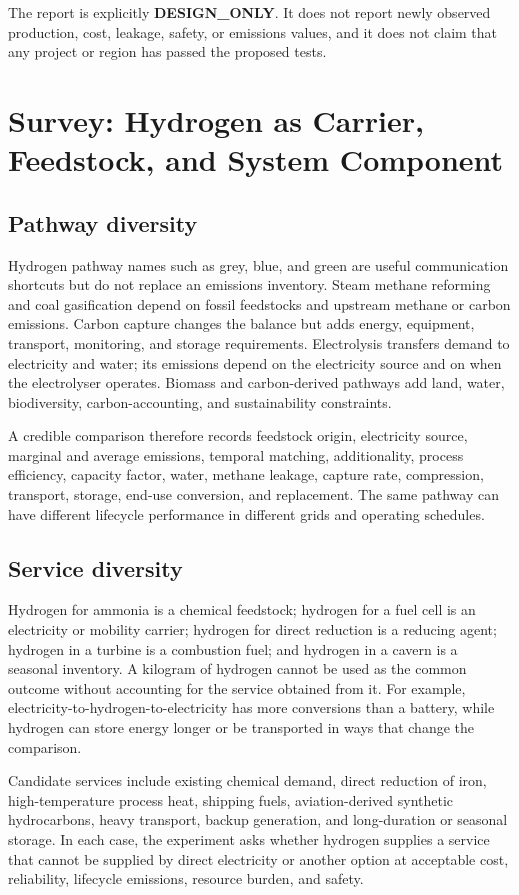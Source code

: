 \documentclass[conference]{IEEEtran}
\begin{document}
The report is explicitly \textbf{DESIGN\_ONLY}. It does not report newly observed production, cost, leakage, safety, or emissions values, and it does not claim that any project or region has passed the proposed tests.

\section{Survey: Hydrogen as Carrier, Feedstock, and System Component}
\label{sec:survey}
\subsection{Pathway diversity}
Hydrogen pathway names such as grey, blue, and green are useful communication shortcuts but do not replace an emissions inventory. Steam methane reforming and coal gasification depend on fossil feedstocks and upstream methane or carbon emissions. Carbon capture changes the balance but adds energy, equipment, transport, monitoring, and storage requirements. Electrolysis transfers demand to electricity and water; its emissions depend on the electricity source and on when the electrolyser operates. Biomass and carbon-derived pathways add land, water, biodiversity, carbon-accounting, and sustainability constraints.

A credible comparison therefore records feedstock origin, electricity source, marginal and average emissions, temporal matching, additionality, process efficiency, capacity factor, water, methane leakage, capture rate, compression, transport, storage, end-use conversion, and replacement. The same pathway can have different lifecycle performance in different grids and operating schedules.

\subsection{Service diversity}
Hydrogen for ammonia is a chemical feedstock; hydrogen for a fuel cell is an electricity or mobility carrier; hydrogen for direct reduction is a reducing agent; hydrogen in a turbine is a combustion fuel; and hydrogen in a cavern is a seasonal inventory. A kilogram of hydrogen cannot be used as the common outcome without accounting for the service obtained from it. For example, electricity-to-hydrogen-to-electricity has more conversions than a battery, while hydrogen can store energy longer or be transported in ways that change the comparison.

Candidate services include existing chemical demand, direct reduction of iron, high-temperature process heat, shipping fuels, aviation-derived synthetic hydrocarbons, heavy transport, backup generation, and long-duration or seasonal storage. In each case, the experiment asks whether hydrogen supplies a service that cannot be supplied by direct electricity or another option at acceptable cost, reliability, lifecycle emissions, resource burden, and safety.
\end{document}
